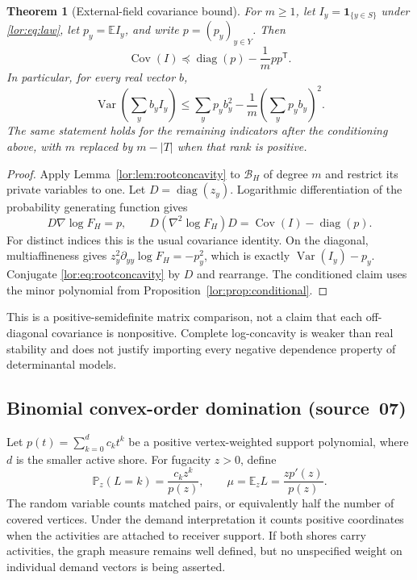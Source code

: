 \documentclass[11pt]{article}
\numberwithin{equation}{section}
\newtheorem{theorem}{Theorem}[section]
\theoremstyle{definition}
\newcommand{\diag}{\operatorname{diag}}
\newcommand{\Var}{\operatorname{Var}}
\newcommand{\EE}{\mathbb E}
\newcommand{\PP}{\mathbb P}
\newcommand{\ind}{\mathbf 1}
\newcommand{\Cov}{\operatorname{Cov}}
\begin{document}
\begin{theorem}[External-field covariance bound]\label{lor:thm:covariance}
For $m\ge1$, let $I_y=\ind_{\{y\in S\}}$ under \eqref{lor:eq:law}, let
$p_y=\EE I_y$, and write $p=(p_y)_{y\in Y}$. Then
\begin{equation}
 \boxed{\Cov(I)\preceq\diag(p)-\frac1m pp^{\mathsf T}.}
 \label{lor:eq:covariance}
\end{equation}
In particular, for every real vector $b$,
\begin{equation}
 \Var\!\left(\sum_yb_yI_y\right)
 \le\sum_yp_yb_y^2-\frac1m\left(\sum_yp_yb_y\right)^2.
 \label{lor:eq:linearvariance}
\end{equation}
The same statement holds for the remaining indicators after the
conditioning above, with $m$ replaced by $m-|T|$ when that rank is positive.
\end{theorem}
\begin{proof}
Apply Lemma~\ref{lor:lem:rootconcavity} to $\mathcal B_H$ of degree $m$ and
restrict its private variables to one. Let $D=\diag(z_y)$.
Logarithmic differentiation of the probability generating function gives
\begin{equation}
 D\nabla\log F_H=p,
 \qquad
 D(\nabla^2\log F_H)D=\Cov(I)-\diag(p).
 \label{lor:eq:covhessian}
\end{equation}
For distinct indices this is the usual covariance identity. On the
diagonal, multiaffineness gives
$z_y^2\partial_{yy}\log F_H=-p_y^2$, which is exactly
$\Var(I_y)-p_y$. Conjugate \eqref{lor:eq:rootconcavity} by $D$ and rearrange.
The conditioned claim uses the minor polynomial from
Proposition~\ref{lor:prop:conditional}.
\end{proof}
This is a positive-semidefinite matrix comparison, not a claim that each
off-diagonal covariance is nonpositive. Complete log-concavity is weaker
than real stability and does not justify importing every negative
dependence property of determinantal models.


\subsection{Binomial convex-order domination (source~07)}
\label{lor:sec:sp:probability}
Let $p(t)=\sum_{k=0}^{d}c_k t^k$ be a positive vertex-weighted support polynomial,
where $d$ is the smaller active shore. For fugacity $z>0$, define
\begin{equation}
 \PP_z(L=k)=\frac{c_kz^k}{p(z)},\qquad
 \mu=\EE_zL=\frac{zp'(z)}{p(z)}.
 \label{lor:sp:eq:law}
\end{equation}
The random variable counts matched pairs, or equivalently half the number of
covered vertices. Under the demand interpretation it counts positive
coordinates when the activities are attached to receiver support. If both
shores carry activities, the graph measure remains well defined, but no
unspecified weight on individual demand vectors is being asserted.
\end{document}
